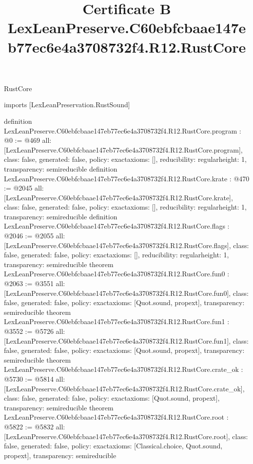\begin{lexlean}{RustCore}
\title{Certificate B LexLeanPreserve.C60ebfcbaae147eb77ec6e4a3708732f4.R12.RustCore}
\begin{coremodule}
imports [LexLeanPreservation.RustSound]

definition LexLeanPreserve.C60ebfcbaae147eb77ec6e4a3708732f4.R12.RustCore.program : @0 := @469 {
  all: [LexLeanPreserve.C60ebfcbaae147eb77ec6e4a3708732f4.R12.RustCore.program],
  class: false,
  generated: false,
  policy: exact{axioms: []},
  reducibility: regular{height: 1},
  transparency: semireducible
}
definition LexLeanPreserve.C60ebfcbaae147eb77ec6e4a3708732f4.R12.RustCore.krate : @470 := @2045 {
  all: [LexLeanPreserve.C60ebfcbaae147eb77ec6e4a3708732f4.R12.RustCore.krate],
  class: false,
  generated: false,
  policy: exact{axioms: []},
  reducibility: regular{height: 1},
  transparency: semireducible
}
definition LexLeanPreserve.C60ebfcbaae147eb77ec6e4a3708732f4.R12.RustCore.flags : @2046 := @2055 {
  all: [LexLeanPreserve.C60ebfcbaae147eb77ec6e4a3708732f4.R12.RustCore.flags],
  class: false,
  generated: false,
  policy: exact{axioms: []},
  reducibility: regular{height: 1},
  transparency: semireducible
}
theorem LexLeanPreserve.C60ebfcbaae147eb77ec6e4a3708732f4.R12.RustCore.fun0 : @2063 := @3551 {
  all: [LexLeanPreserve.C60ebfcbaae147eb77ec6e4a3708732f4.R12.RustCore.fun0],
  class: false,
  generated: false,
  policy: exact{axioms: [Quot.sound, propext]},
  transparency: semireducible
}
theorem LexLeanPreserve.C60ebfcbaae147eb77ec6e4a3708732f4.R12.RustCore.fun1 : @3552 := @5726 {
  all: [LexLeanPreserve.C60ebfcbaae147eb77ec6e4a3708732f4.R12.RustCore.fun1],
  class: false,
  generated: false,
  policy: exact{axioms: [Quot.sound, propext]},
  transparency: semireducible
}
theorem LexLeanPreserve.C60ebfcbaae147eb77ec6e4a3708732f4.R12.RustCore.crate_ok : @5730 := @5814 {
  all: [LexLeanPreserve.C60ebfcbaae147eb77ec6e4a3708732f4.R12.RustCore.crate_ok],
  class: false,
  generated: false,
  policy: exact{axioms: [Quot.sound, propext]},
  transparency: semireducible
}
theorem LexLeanPreserve.C60ebfcbaae147eb77ec6e4a3708732f4.R12.RustCore.root : @5822 := @5832 {
  all: [LexLeanPreserve.C60ebfcbaae147eb77ec6e4a3708732f4.R12.RustCore.root],
  class: false,
  generated: false,
  policy: exact{axioms: [Classical.choice, Quot.sound, propext]},
  transparency: semireducible
}


\end{coremodule}
\end{lexlean}
